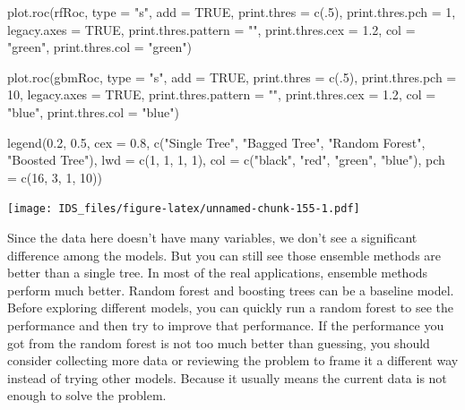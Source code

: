 \documentclass[
  12pt,
]{krantz}
\makeatletter
\newenvironment{Shaded}{\begin{snugshade}}{\end{snugshade}}
\newcommand{\AttributeTok}[1]{\textcolor[rgb]{0.61,0.61,0.61}{#1}}
\newcommand{\ConstantTok}[1]{\textcolor[rgb]{0,0,0}{#1}}
\newcommand{\DecValTok}[1]{\textcolor[rgb]{0.06,0.06,0.06}{#1}}
\newcommand{\FloatTok}[1]{\textcolor[rgb]{0.06,0.06,0.06}{#1}}
\newcommand{\FunctionTok}[1]{\textcolor[rgb]{0,0,0}{#1}}
\newcommand{\NormalTok}[1]{#1}
\newcommand{\StringTok}[1]{\textcolor[rgb]{0.5,0.5,0.5}{#1}}
\newenvironment{kframe}{%
\medskip{}
\setlength{\fboxsep}{.8em}
 \def\at@end@of@kframe{}%
 \ifinner\ifhmode%
  \def\at@end@of@kframe{\end{minipage}}%
  \begin{minipage}{\columnwidth}%
 \fi\fi%
 \def\FrameCommand##1{\hskip\@totalleftmargin \hskip-\fboxsep
 \colorbox{shadecolor}{##1}\hskip-\fboxsep
     \hskip-\linewidth \hskip-\@totalleftmargin \hskip\columnwidth}%
 \MakeFramed {\advance\hsize-\width
   \@totalleftmargin\z@ \linewidth\hsize
   \@setminipage}}%
 {\par\unskip\endMakeFramed%
 \at@end@of@kframe}
\renewenvironment{Shaded}{\begin{kframe}}{\end{kframe}}
\makeatother
\begin{document}
\begin{Shaded}
\begin{Highlighting}[]
\FunctionTok{plot.roc}\NormalTok{(rfRoc, }
     \AttributeTok{type =} \StringTok{"s"}\NormalTok{, }
     \AttributeTok{add =} \ConstantTok{TRUE}\NormalTok{, }
     \AttributeTok{print.thres =} \FunctionTok{c}\NormalTok{(.}\DecValTok{5}\NormalTok{), }\AttributeTok{print.thres.pch =} \DecValTok{1}\NormalTok{, }
     \AttributeTok{legacy.axes =} \ConstantTok{TRUE}\NormalTok{, }\AttributeTok{print.thres.pattern =} \StringTok{""}\NormalTok{, }
     \AttributeTok{print.thres.cex =} \FloatTok{1.2}\NormalTok{,}
     \AttributeTok{col =} \StringTok{"green"}\NormalTok{, }\AttributeTok{print.thres.col =} \StringTok{"green"}\NormalTok{)}

\FunctionTok{plot.roc}\NormalTok{(gbmRoc, }
     \AttributeTok{type =} \StringTok{"s"}\NormalTok{, }
     \AttributeTok{add =} \ConstantTok{TRUE}\NormalTok{, }
     \AttributeTok{print.thres =} \FunctionTok{c}\NormalTok{(.}\DecValTok{5}\NormalTok{), }\AttributeTok{print.thres.pch =} \DecValTok{10}\NormalTok{, }
     \AttributeTok{legacy.axes =} \ConstantTok{TRUE}\NormalTok{, }\AttributeTok{print.thres.pattern =} \StringTok{""}\NormalTok{, }
     \AttributeTok{print.thres.cex =} \FloatTok{1.2}\NormalTok{,}
     \AttributeTok{col =} \StringTok{"blue"}\NormalTok{, }\AttributeTok{print.thres.col =} \StringTok{"blue"}\NormalTok{)}

\FunctionTok{legend}\NormalTok{(}\FloatTok{0.2}\NormalTok{, }\FloatTok{0.5}\NormalTok{, }\AttributeTok{cex =} \FloatTok{0.8}\NormalTok{,}
       \FunctionTok{c}\NormalTok{(}\StringTok{"Single Tree"}\NormalTok{, }\StringTok{"Bagged Tree"}\NormalTok{, }
         \StringTok{"Random Forest"}\NormalTok{, }\StringTok{"Boosted Tree"}\NormalTok{),}
       \AttributeTok{lwd =} \FunctionTok{c}\NormalTok{(}\DecValTok{1}\NormalTok{, }\DecValTok{1}\NormalTok{, }\DecValTok{1}\NormalTok{, }\DecValTok{1}\NormalTok{),}
       \AttributeTok{col =} \FunctionTok{c}\NormalTok{(}\StringTok{"black"}\NormalTok{, }\StringTok{"red"}\NormalTok{, }\StringTok{"green"}\NormalTok{, }\StringTok{"blue"}\NormalTok{),}
       \AttributeTok{pch =} \FunctionTok{c}\NormalTok{(}\DecValTok{16}\NormalTok{, }\DecValTok{3}\NormalTok{, }\DecValTok{1}\NormalTok{, }\DecValTok{10}\NormalTok{))}
\end{Highlighting}
\end{Shaded}

\texttt{[image: IDS\_files/figure-latex/unnamed-chunk-155-1.pdf]}

Since the data here doesn't have many variables, we don't see a significant difference among the models. But you can still see those ensemble methods are better than a single tree. In most of the real applications, ensemble methods perform much better. Random forest and boosting trees can be a baseline model. Before exploring different models, you can quickly run a random forest to see the performance and then try to improve that performance. If the performance you got from the random forest is not too much better than guessing, you should consider collecting more data or reviewing the problem to frame it a different way instead of trying other models. Because it usually means the current data is not enough to solve the problem.
\end{document}
